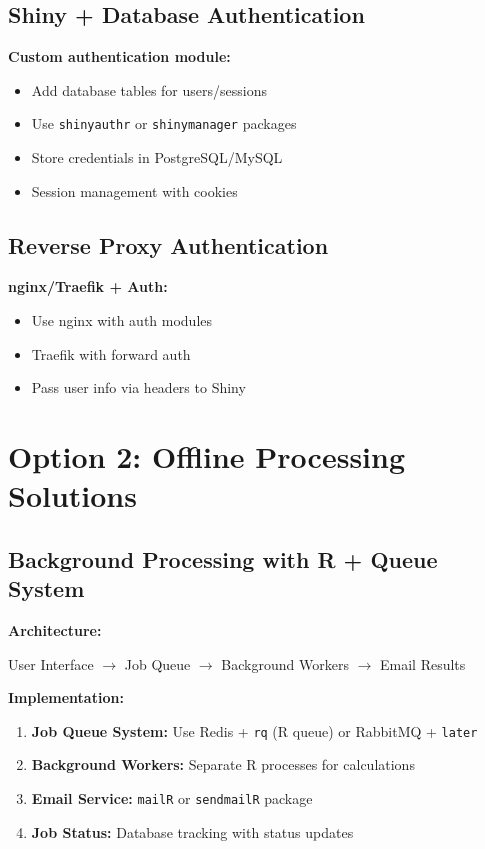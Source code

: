 \documentclass{article}
\begin{document}
\subsection{Shiny + Database Authentication}
\textbf{Custom authentication module:}
\begin{itemize}
\item Add database tables for users/sessions
\item Use \texttt{shinyauthr} or \texttt{shinymanager} packages
\item Store credentials in PostgreSQL/MySQL
\item Session management with cookies
\end{itemize}

\subsection{Reverse Proxy Authentication}
\textbf{nginx/Traefik + Auth:}
\begin{itemize}
\item Use nginx with auth modules
\item Traefik with forward auth
\item Pass user info via headers to Shiny
\end{itemize}

\section{Option 2: Offline Processing Solutions}

\subsection{Background Processing with R + Queue System}

\textbf{Architecture:}
\begin{center}
User Interface $\rightarrow$ Job Queue $\rightarrow$ Background Workers $\rightarrow$ Email Results
\end{center}

\textbf{Implementation:}
\begin{enumerate}
\item \textbf{Job Queue System:} Use Redis + \texttt{rq} (R queue) or RabbitMQ + \texttt{later}
\item \textbf{Background Workers:} Separate R processes for calculations
\item \textbf{Email Service:} \texttt{mailR} or \texttt{sendmailR} package
\item \textbf{Job Status:} Database tracking with status updates
\end{enumerate}
\end{document}
